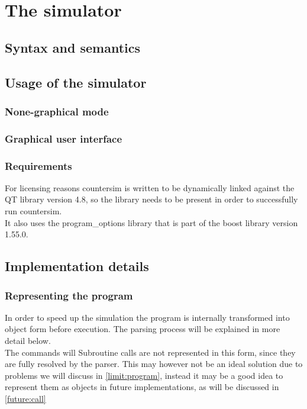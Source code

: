\chapter{The simulator}
\label{chap:simulator}
\section{Syntax and semantics}
\section{Usage of the simulator}
\subsection{None-graphical mode}
\subsection{Graphical user interface}
\subsection{Requirements}
For licensing reasons countersim is written to be dynamically linked against the QT library version 4.8, so the library needs to be present in order to successfully run countersim.\\
It also uses the program\_options library that is part of the boost library version 1.55.0.
\section{Implementation details}
\subsection{Representing the program}
In order to speed up the simulation the program is internally transformed into object form before execution. The parsing process will be explained in more detail below.\\
The commands will 
Subroutine calls are not represented in this form, since they are fully resolved by the parser. This may however not be an ideal solution due to problems we will discuss in \autoref{limit:program}, instead it may be a good idea to represent them as objects in future implementations, as will be discussed in \autoref{future:call}


